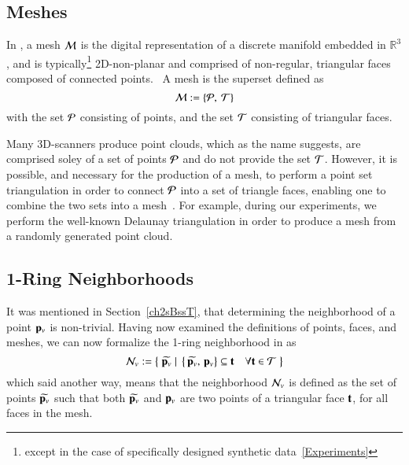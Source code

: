 \subsection{Meshes}
\label{ch2s3ssM}
In \tdd{}, a mesh $\mathcal{M}$ is the digital representation of a discrete manifold embedded in $\mathbb{R}^3$, and is typically\footnote{except in the case of specifically designed synthetic data~\ref{Experiments}} 2D-non-planar and comprised of non-regular, triangular faces composed of connected points.~\cite[p.~25]{Mara12} A mesh is the superset defined as
\begin{equation}
	\mathcal{M} := \left \{\mathcal{P},\:\mathcal{T}\right \}
	\label{eq:defineMesh}
\end{equation}%
%
with the set $\mathcal{P}$ consisting of points, and the set $\mathcal{T}$ consisting of triangular faces.

Many 3D-scanners produce point clouds\todoCitation{}{}, which as the name suggests, are comprised soley of a set of points $\mathcal{P}$ and do not provide the set $\mathcal{T}$. However, it is possible, and necessary for the production of a mesh, to perform a point set triangulation\todoCitation{}{} in order to connect $\mathcal{P}$ into a set of triangle faces, enabling one to combine the two sets into a mesh~\cite[p.~26]{Mara12}. For example, during our experiments, we perform the well-known Delaunay triangulation\todoCitation{} in order to produce a mesh from a randomly generated point cloud.
%
\subsection{1-Ring Neighborhoods}
\label{ch2s3ssNRN}
It was mentioned in Section~\ref{ch2sBssT}, that determining the neighborhood of a point $\mathbf{p}_v$ is non-trivial. Having now examined the definitions of points, faces, and meshes, we can now formalize the 1-ring neighborhood in \tdd{} as
\begin{equation}
	\mathcal{N}_v := \left \{\;\widetilde{\mathbf{p}_v}\;|\;\left \{\,\widetilde{\mathbf{p}_v},\,\mathbf{p}_v\right \} \subseteq \mathbf{t} \quad \forall \mathbf{t} \in \mathcal{T}\;\right \}
	\label{eq:defineNeighborhood}
\end{equation}%
%
%
which said another way, means that the neighborhood $\mathcal{N}_v$ is defined as the set of points $\widetilde{\mathbf{p}_v}$ such that both $\widetilde{\mathbf{p}_v}$ and $\mathbf{p}_v$ are two points of a triangular face $\mathbf{t}$, for all faces in the mesh.

